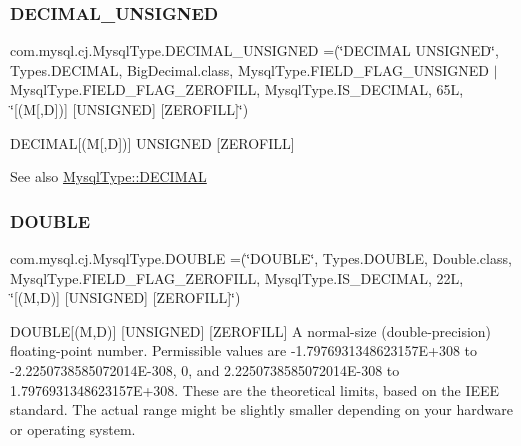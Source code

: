 \subsubsection{\texorpdfstring{D\+E\+C\+I\+M\+A\+L\+\_\+\+U\+N\+S\+I\+G\+N\+ED}{DECIMAL\_UNSIGNED}}
{\footnotesize\ttfamily com.\+mysql.\+cj.\+Mysql\+Type.\+D\+E\+C\+I\+M\+A\+L\+\_\+\+U\+N\+S\+I\+G\+N\+ED =(\char`\"{}D\+E\+C\+I\+M\+AL U\+N\+S\+I\+G\+N\+ED\char`\"{}, Types.\+D\+E\+C\+I\+M\+AL, Big\+Decimal.\+class, Mysql\+Type.\+F\+I\+E\+L\+D\+\_\+\+F\+L\+A\+G\+\_\+\+U\+N\+S\+I\+G\+N\+ED $\vert$ Mysql\+Type.\+F\+I\+E\+L\+D\+\_\+\+F\+L\+A\+G\+\_\+\+Z\+E\+R\+O\+F\+I\+LL, Mysql\+Type.\+I\+S\+\_\+\+D\+E\+C\+I\+M\+AL, 65\+L, \char`\"{}\mbox{[}(\+M\mbox{[},\+D\mbox{]})\mbox{]} \mbox{[}\+U\+N\+S\+I\+G\+N\+E\+D\mbox{]} \mbox{[}\+Z\+E\+R\+O\+F\+I\+L\+L\mbox{]}\char`\"{})}

D\+E\+C\+I\+M\+AL\mbox{[}(M\mbox{[},D\mbox{]})\mbox{]} U\+N\+S\+I\+G\+N\+ED \mbox{[}Z\+E\+R\+O\+F\+I\+LL\mbox{]}

\begin{DoxySeeAlso}{See also}
\mbox{\hyperlink{enumcom_1_1mysql_1_1cj_1_1_mysql_type_a90f5401b1fa7f31d2d384156fa552e2c}{Mysql\+Type\+::\+D\+E\+C\+I\+M\+AL}} 
\end{DoxySeeAlso}
\mbox{\label{enumcom_1_1mysql_1_1cj_1_1_mysql_type_a3f95bc5758ff4e4f6ce9cd1fb1889400}} 
\subsubsection{\texorpdfstring{D\+O\+U\+B\+LE}{DOUBLE}}
{\footnotesize\ttfamily com.\+mysql.\+cj.\+Mysql\+Type.\+D\+O\+U\+B\+LE =(\char`\"{}D\+O\+U\+B\+LE\char`\"{}, Types.\+D\+O\+U\+B\+LE, Double.\+class, Mysql\+Type.\+F\+I\+E\+L\+D\+\_\+\+F\+L\+A\+G\+\_\+\+Z\+E\+R\+O\+F\+I\+LL, Mysql\+Type.\+I\+S\+\_\+\+D\+E\+C\+I\+M\+AL, 22\+L, \char`\"{}\mbox{[}(\+M,\+D)\mbox{]} \mbox{[}\+U\+N\+S\+I\+G\+N\+E\+D\mbox{]} \mbox{[}\+Z\+E\+R\+O\+F\+I\+L\+L\mbox{]}\char`\"{})}

D\+O\+U\+B\+LE\mbox{[}(M,D)\mbox{]} \mbox{[}U\+N\+S\+I\+G\+N\+ED\mbox{]} \mbox{[}Z\+E\+R\+O\+F\+I\+LL\mbox{]} A normal-\/size (double-\/precision) floating-\/point number. Permissible values are -\/1.\+7976931348623157E+308 to -\/2.\+2250738585072014E-\/308, 0, and 2.\+2250738585072014E-\/308 to 1.\+7976931348623157E+308. These are the theoretical limits, based on the I\+E\+EE standard. The actual range might be slightly smaller depending on your hardware or operating system.

